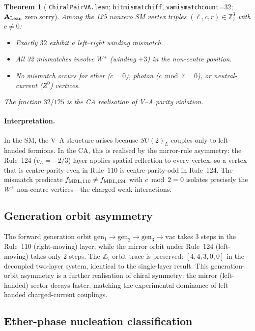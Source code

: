 \documentclass[11pt]{article}
\newtheorem{theorem}{Theorem}[section]
\theoremstyle{remark}
\newcommand{\ZS}{\mathbb{Z}_7}
\newcommand{\lean}[1]{%
  \penalty-100
  \begingroup\def\_{\textunderscore\allowbreak}\texttt{#1}\endgroup}
\newcommand{\CatAL}{\ensuremath{\textbf{A}_{\rm Lean}}}
\begin{document}
\begin{theorem}[\lean{ChiralPairVA.lean};
  \lean{bit\_mismatch\_iff},
  \lean{va\_mismatch\_count}=32; \CatAL{} zero sorry]
  \label{thm:va}
  Among the 125 nonzero SM vertex triples $(\ell,c,r)\in\ZS^3$
  with $c\neq 0$:
  \begin{itemize}[noitemsep]
    \item Exactly $32$ exhibit a left--right winding mismatch.
    \item All 32 mismatches involve $W^+$ (winding $+3$) in the non-centre
      position.
    \item No mismatch occurs for ether ($c=0$), photon ($c\bmod7=0$),
      or neutral-current ($Z^0$) vertices.
  \end{itemize}
  The fraction $32/125$ is the CA realisation of V--A parity violation.
\end{theorem}

\paragraph{Interpretation.}
In the SM, the V--A structure arises because $SU(2)_L$ couples only to
left-handed fermions.  In the CA, this is realised by the mirror-rule
asymmetry: the Rule~124 ($v_L=-2/3$) layer applies spatial reflection to
every vertex, so a vertex that is centre-parity-even in Rule~110 is
centre-parity-odd in Rule~124.  The mismatch predicate
$f_{\rm MDL,110}\neq f_{\rm MDL,124}$ with $c\bmod 2=0$ isolates precisely
the $W^+$ non-centre vertices---the charged weak interactions.

\subsection{Generation orbit asymmetry}
\label{ssec:gen_asymm}

The forward generation orbit gen$_1\to\mathrm{gen}_2\to\mathrm{gen}_3\to\mathrm{vac}$
takes 3 steps in the Rule~110 (right-moving) layer, while the mirror orbit
under Rule~124 (left-moving) takes only 2 steps.  The $\ZS$ orbit trace is
preserved: $[4,4,3,0,0]$ in the decoupled two-layer system, identical to
the single-layer result.  This generation-orbit asymmetry is a further
realisation of chiral symmetry: the mirror (left-handed) sector decays
faster, matching the experimental dominance of left-handed charged-current
couplings.

\subsection{Ether-phase nucleation classification}
\label{ssec:ether_class}
\end{document}
